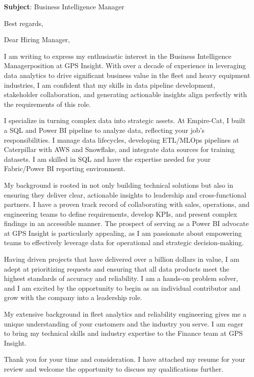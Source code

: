 \documentclass[11pt,a4paper,roman]{moderncv}
\newcommand{\companyname}{GPS Insight}
\newcommand{\jobtitle}{Business Intelligence Manager}
\begin{document}
\date{\today}
\opening{\textbf{Subject}: \jobtitle}
\closing{Best regards,}
\makelettertitle

\vspace{0.25cm}


Dear Hiring Manager,

I am writing to express my enthusiastic interest in the \jobtitle position at \companyname. With over a decade of experience in leveraging data analytics to drive significant business value in the fleet and heavy equipment industries, I am confident that my skills in data pipeline development, stakeholder collaboration, and generating actionable insights align perfectly with the requirements of this role.

I specialize in turning complex data into strategic assets. At Empire-Cat, I built a SQL and Power BI pipeline to analyze data, reflecting your job's responsibilities. I manage data lifecycles, developing ETL/MLOps pipelines at Caterpillar with AWS and Snowflake, and integrate data sources for training datasets. I am skilled in SQL and have the expertise needed for your Fabric/Power BI reporting environment.

My background is rooted in not only building technical solutions but also in ensuring they deliver clear, actionable insights to leadership and cross-functional partners. I have a proven track record of collaborating with sales, operations, and engineering teams to define requirements, develop KPIs, and present complex findings in an accessible manner. The prospect of serving as a Power BI advocate at GPS Insight is particularly appealing, as I am passionate about empowering teams to effectively leverage data for operational and strategic decision-making.

Having driven projects that have delivered over a billion dollars in value, I am adept at prioritizing requests and ensuring that all data products meet the highest standards of accuracy and reliability. I am a hands-on problem solver, and I am excited by the opportunity to begin as an individual contributor and grow with the company into a leadership role.

My extensive background in fleet analytics and reliability engineering gives me a unique understanding of your customers and the industry you serve. I am eager to bring my technical skills and industry expertise to the Finance team at \companyname.

Thank you for your time and consideration. I have attached my resume for your review and welcome the opportunity to discuss my qualifications further.


 
\makeletterclosing
\end{document}
